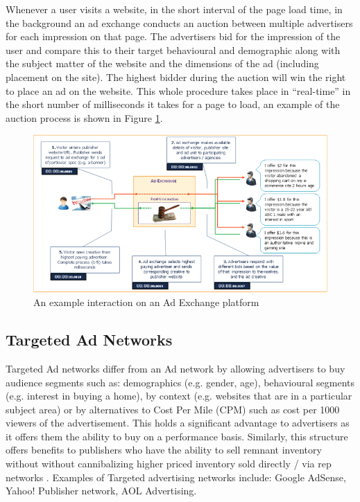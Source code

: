 \documentclass{article}
\begin{document}
Whenever a user visits a website, in the short interval of the page load time, in the background an ad exchange conducts an auction between multiple advertisers for each impression on that page. The advertisers bid for the impression of the user and compare this to their target behavioural and demographic along with the subject matter of the website and the dimensions of the ad (including placement on the site). The highest bidder during the auction will win the right to place an ad on the website. This whole procedure takes place in ``real-time'' in the short number of milliseconds it takes for a page to load, an example of the auction process is shown in Figure \ref{fig:adExchange}. 

\begin{figure}[H]
    \centering
    \includegraphics[width=1\textwidth]{adExchange}
    \caption{An example interaction on an Ad Exchange platform \parencite{adExchanges}}
    \label{fig:adExchange}
\end{figure}

\subsection{Targeted Ad Networks}
Targeted Ad networks differ from an Ad network by allowing advertisers to buy audience segments such as: demographics (e.g. gender, age),  behavioural segments (e.g. interest in buying a home), by context (e.g. websites that are in a particular subject area) or by alternatives to Cost Per Mile (CPM) such as cost per 1000 viewers of the advertisement. This holds a significant advantage to advertisers as it offers them the ability to buy on a performance basis. Similarly, this structure offers benefits to publishers who have the ability to sell remnant inventory without without cannibalizing higher priced inventory sold directly / via rep networks \parencite{adExchanges}. Examples of Targeted advertising networks include: Google AdSense, Yahoo! Publisher network, AOL Advertising. 
\end{document}
